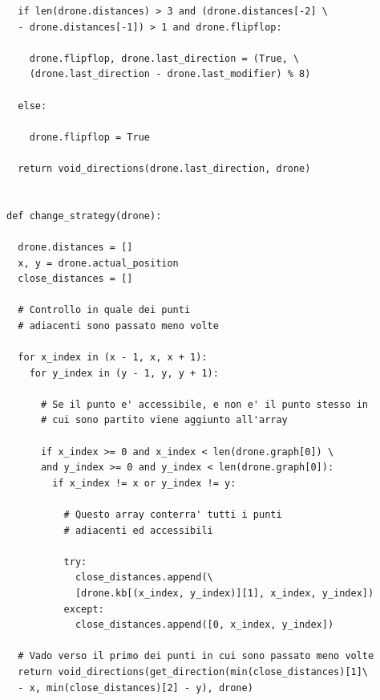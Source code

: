 \begin{verbatim}
  if len(drone.distances) > 3 and (drone.distances[-2] \
  - drone.distances[-1]) > 1 and drone.flipflop:

    drone.flipflop, drone.last_direction = (True, \
    (drone.last_direction - drone.last_modifier) % 8)

  else:

    drone.flipflop = True

  return void_directions(drone.last_direction, drone)


def change_strategy(drone):

  drone.distances = []
  x, y = drone.actual_position
  close_distances = []

  # Controllo in quale dei punti 
  # adiacenti sono passato meno volte

  for x_index in (x - 1, x, x + 1):
    for y_index in (y - 1, y, y + 1):

      # Se il punto e' accessibile, e non e' il punto stesso in 
      # cui sono partito viene aggiunto all'array

      if x_index >= 0 and x_index < len(drone.graph[0]) \
      and y_index >= 0 and y_index < len(drone.graph[0]):
        if x_index != x or y_index != y:

          # Questo array conterra' tutti i punti 
          # adiacenti ed accessibili

          try:
            close_distances.append(\
            [drone.kb[(x_index, y_index)][1], x_index, y_index])
          except:
            close_distances.append([0, x_index, y_index])

  # Vado verso il primo dei punti in cui sono passato meno volte
  return void_directions(get_direction(min(close_distances)[1]\
  - x, min(close_distances)[2] - y), drone)

\end{verbatim}
	
